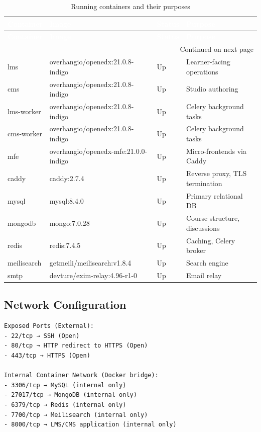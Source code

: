 \begin{center}
\begin{longtable}{|l|l|l|l|}
\caption[Container Architecture]{Running containers and their purposes}
\label{tab:containers} \\
\hline
\rowcolor{mooveblue}
\textbf{\textcolor{white}{Container}} & \textbf{\textcolor{white}{Image}} & \textbf{\textcolor{white}{Status}} & \textbf{\textcolor{white}{Purpose}} \\
\hline
\endfirsthead
\hline
\rowcolor{mooveblue}
\textbf{\textcolor{white}{Container}} & \textbf{\textcolor{white}{Image}} & \textbf{\textcolor{white}{Status}} & \textbf{\textcolor{white}{Purpose}} \\
\hline
\endhead
\hline
\multicolumn{4}{|r|}{Continued on next page} \\
\hline
\endfoot
\hline
\endlastfoot
lms & overhangio/openedx:21.0.8-indigo & Up  & Learner-facing operations \\
cms & overhangio/openedx:21.0.8-indigo & Up  & Studio authoring \\
lms-worker & overhangio/openedx:21.0.8-indigo & Up  & Celery background tasks \\
cms-worker & overhangio/openedx:21.0.8-indigo & Up  & Celery background tasks \\
mfe & overhangio/openedx-mfe:21.0.0-indigo & Up  & Micro-frontends via Caddy \\
caddy & caddy:2.7.4 & Up  & Reverse proxy, TLS termination \\
mysql & mysql:8.4.0 & Up  & Primary relational DB \\
mongodb & mongo:7.0.28 & Up  & Course structure, discussions \\
redis & redis:7.4.5 & Up  & Caching, Celery broker \\
meilisearch & getmeili/meilisearch:v1.8.4 & Up  & Search engine \\
smtp & devture/exim-relay:4.96-r1-0 & Up  & Email relay \\
\hline
\end{longtable}
\end{center}

\subsection{Network Configuration}
\begin{verbatim}
Exposed Ports (External):
- 22/tcp → SSH (Open)
- 80/tcp → HTTP redirect to HTTPS (Open)
- 443/tcp → HTTPS (Open)

Internal Container Network (Docker bridge):
- 3306/tcp → MySQL (internal only)
- 27017/tcp → MongoDB (internal only)
- 6379/tcp → Redis (internal only)
- 7700/tcp → Meilisearch (internal only)
- 8000/tcp → LMS/CMS application (internal only)
\end{verbatim}

